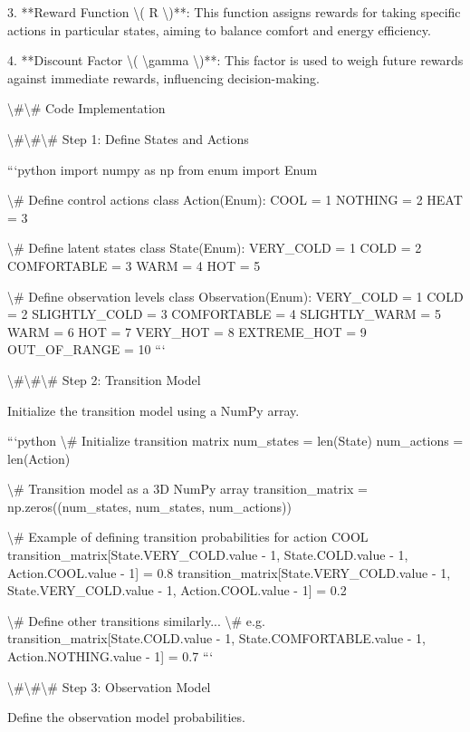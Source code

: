 \documentclass[11pt,a4paper]{article}
\begin{document}
3. **Reward Function \textbackslash{}( R \textbackslash{})**: This function assigns rewards for taking specific actions in particular states, aiming to balance comfort and energy efficiency.

4. **Discount Factor \textbackslash{}( \textbackslash{}gamma \textbackslash{})**: This factor is used to weigh future rewards against immediate rewards, influencing decision-making.

\textbackslash{}#\textbackslash{}# Code Implementation

\textbackslash{}#\textbackslash{}#\textbackslash{}# Step 1: Define States and Actions

```python
import numpy as np
from enum import Enum

\textbackslash{}# Define control actions
class Action(Enum):
    COOL = 1
    NOTHING = 2
    HEAT = 3

\textbackslash{}# Define latent states
class State(Enum):
    VERY_COLD = 1
    COLD = 2
    COMFORTABLE = 3
    WARM = 4
    HOT = 5

\textbackslash{}# Define observation levels
class Observation(Enum):
    VERY_COLD = 1
    COLD = 2
    SLIGHTLY_COLD = 3
    COMFORTABLE = 4
    SLIGHTLY_WARM = 5
    WARM = 6
    HOT = 7
    VERY_HOT = 8
    EXTREME_HOT = 9
    OUT_OF_RANGE = 10
```

\textbackslash{}#\textbackslash{}#\textbackslash{}# Step 2: Transition Model

Initialize the transition model using a NumPy array.

```python
\textbackslash{}# Initialize transition matrix
num_states = len(State)
num_actions = len(Action)

\textbackslash{}# Transition model as a 3D NumPy array
transition_matrix = np.zeros((num_states, num_states, num_actions))

\textbackslash{}# Example of defining transition probabilities for action COOL
transition_matrix[State.VERY_COLD.value - 1, State.COLD.value - 1, Action.COOL.value - 1] = 0.8
transition_matrix[State.VERY_COLD.value - 1, State.VERY_COLD.value - 1, Action.COOL.value - 1] = 0.2

\textbackslash{}# Define other transitions similarly...
\textbackslash{}# e.g. transition_matrix[State.COLD.value - 1, State.COMFORTABLE.value - 1, Action.NOTHING.value - 1] = 0.7
```

\textbackslash{}#\textbackslash{}#\textbackslash{}# Step 3: Observation Model

Define the observation model probabilities.
\end{document}
